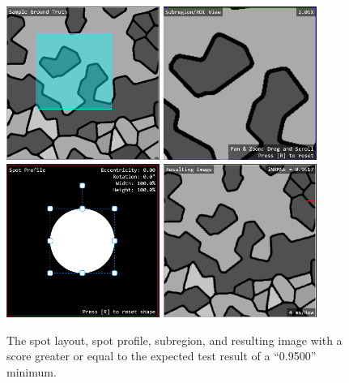 \documentclass[12pt, titlepage]{article}
\begin{document}
\begin{figure}[h!]
  \begin{center}
   \includegraphics[width=5cm]{t13a.png}
   \includegraphics[width=5cm]{t13b.png}
   \includegraphics[width=5cm]{t13c.png}
   \includegraphics[width=5cm]{t13d.png}
  \caption{The spot layout, spot profile, subregion, and resulting image with a score greater or equal to
  the expected test result of a ``0.9500'' minimum.}
  \label{fig_t12} 
  \end{center}
\end{figure}
\end{document}
